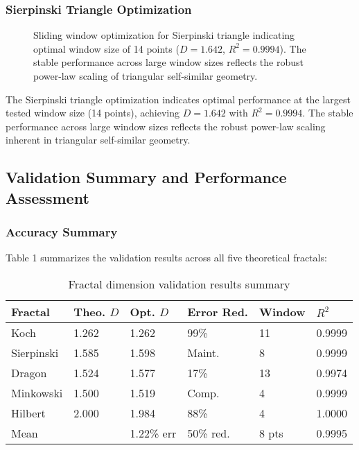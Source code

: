 \documentclass[preprint,12pt]{elsarticle}
\def\textbf#1{#1}%
\begin{document}
\subsubsection{Sierpinski Triangle Optimization}

\begin{figure}[ht]
\centering
\caption{Sliding window optimization for Sierpinski triangle indicating optimal window size of 14 points ($D = 1.642$, $R^2 = 0.9994$). The stable performance across large window sizes reflects the robust power-law scaling of triangular self-similar geometry.}
\label{fig:sierpinski_optimization}
\end{figure}

The Sierpinski triangle optimization indicates optimal performance at the largest tested window size (14 points), achieving $D = 1.642$ with $R^2 = 0.9994$. The stable performance across large window sizes reflects the robust power-law scaling inherent in triangular self-similar geometry.

\subsection{Validation Summary and Performance Assessment}

\subsubsection{Accuracy Summary}

Table 1 summarizes the validation results across all five theoretical fractals:

\begin{table}[ht]
\centering
\footnotesize
\caption{Fractal dimension validation results summary}
\label{tab:validation_summary_compact}
\begin{tabularx}{\textwidth}{@{}lXXXXX@{}}
\toprule
\textbf{Fractal} & \textbf{Theo. $D$} & \textbf{Opt. $D$} & \textbf{Error Red.} & \textbf{Window} & \textbf{$R^2$} \\
\midrule
Koch & 1.262 & 1.262 & 99\% & 11 & 0.9999 \\
Sierpinski & 1.585 & 1.598 & Maint. & 8 & 0.9999 \\
Dragon & 1.524 & 1.577 & 17\% & 13 & 0.9974 \\
Minkowski & 1.500 & 1.519 & Comp. & 4 & 0.9999 \\
Hilbert & 2.000 & 1.984 & 88\% & 4 & 1.0000 \\
\midrule
\textbf{Mean} &  & \textbf{1.22\% err} & \textbf{50\% red.} & \textbf{8 pts} & \textbf{0.9995} \\
\bottomrule
\end{tabularx}
\end{table}
\end{document}
